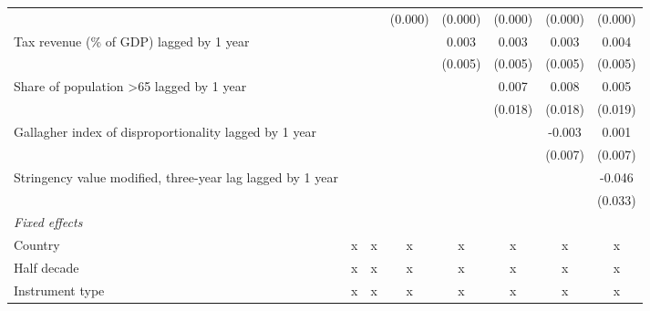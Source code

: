 \begin{tabular}{lccccccc}
                                                                            &              &               & (0.000)        & (0.000)        & (0.000)       & (0.000)       & (0.000)\\   
   Tax revenue (\% of GDP) lagged by 1 year                                 &              &               &                & 0.003          & 0.003         & 0.003         & 0.004\\   
                                                                            &              &               &                & (0.005)        & (0.005)       & (0.005)       & (0.005)\\   
   Share of population >65 lagged by 1 year                                 &              &               &                &                & 0.007         & 0.008         & 0.005\\   
                                                                            &              &               &                &                & (0.018)       & (0.018)       & (0.019)\\   
   Gallagher index of disproportionality lagged by 1 year                   &              &               &                &                &               & -0.003        & 0.001\\   
                                                                            &              &               &                &                &               & (0.007)       & (0.007)\\   
   Stringency value modified, three-year lag lagged by 1 year               &              &               &                &                &               &               & -0.046\\   
                                                                            &              &               &                &                &               &               & (0.033)\\   
   \emph{Fixed effects}\\
   Country                                                                  & x            & x             & x              & x              & x             & x             & x\\  
   Half decade                                                              & x            & x             & x              & x              & x             & x             & x\\  
   Instrument type                                                          & x            & x             & x              & x              & x             & x             & x\\  

\end{tabular}
